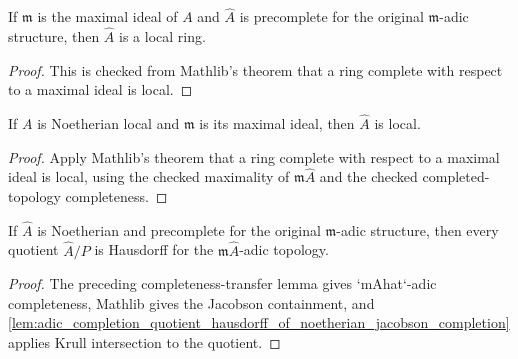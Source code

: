 \begin{lemma}
  \label{lem:adic_completion_is_local_ring_of_original_precomplete}
  If \(\mathfrak m\) is the maximal ideal of \(A\) and \(\widehat A\) is
  precomplete for the original \(\mathfrak m\)-adic structure, then
  \(\widehat A\) is a local ring.
\end{lemma}

\begin{proof}
  This is checked from Mathlib's theorem that a ring complete with respect to
  a maximal ideal is local.
\end{proof}

\begin{lemma}
  \label{lem:adic_completion_is_local_ring_source}
  If \(A\) is Noetherian local and \(\mathfrak m\) is its maximal ideal, then
  \(\widehat A\) is local.
\end{lemma}

\begin{proof}
  Apply Mathlib's theorem that a ring complete with respect to a maximal ideal
  is local, using the checked maximality of \(\mathfrak m\widehat A\) and the
  checked completed-topology completeness.
\end{proof}

\begin{lemma}
  \label{lem:adic_completion_quotient_hausdorff_of_noetherian_original_precomplete}
  If \(\widehat A\) is Noetherian and precomplete for the original
  \(\mathfrak m\)-adic structure, then every quotient \(\widehat A/P\) is
  Hausdorff for the \(\mathfrak m\widehat A\)-adic topology.
\end{lemma}

\begin{proof}
  The preceding completeness-transfer lemma gives `mAhat`-adic completeness,
  Mathlib gives the Jacobson containment, and
  \cref{lem:adic_completion_quotient_hausdorff_of_noetherian_jacobson_completion}
  applies Krull intersection to the quotient.
\end{proof}

